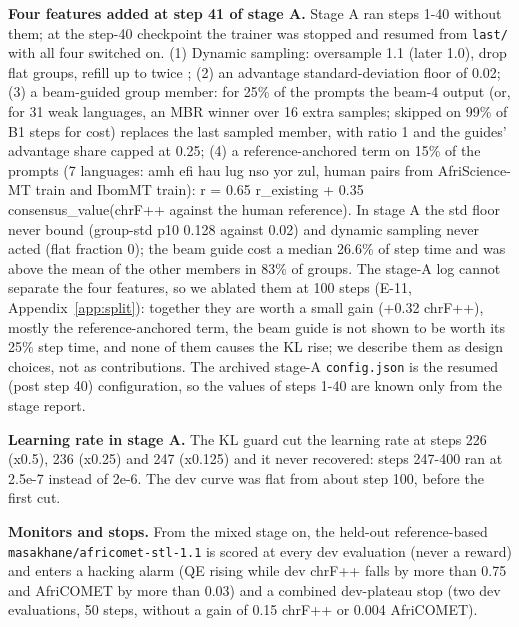 \textbf{Four features added at step 41 of stage A.} Stage A ran steps 1-40 without them; at the step-40 checkpoint the trainer was stopped and resumed from \texttt{last/\allowbreak{}} with all four switched on. (1) Dynamic sampling: oversample 1.1 (later 1.0), drop flat groups, refill up to twice \citep{yu2025dapo}; (2) an advantage standard-deviation floor of 0.02; (3) a beam-guided group member: for 25\% of the prompts the beam-4 output (or, for 31 weak languages, an MBR winner over 16 extra samples; skipped on 99\% of B1 steps for cost) replaces the last sampled member, with ratio 1 and the guides' advantage share capped at 0.25; (4) a reference-anchored term on 15\% of the prompts (7 languages: amh efi hau lug nso yor zul, human pairs from AfriScience-MT train and IbomMT train): r = 0.65 r\_existing + 0.35 consensus\_value(chrF++ against the human reference). In stage A the std floor never bound (group-std p10 0.128 against 0.02) and dynamic sampling never acted (flat fraction 0); the beam guide cost a median 26.6\% of step time and was above the mean of the other members in 83\% of groups. The stage-A log cannot separate the four features, so we ablated them at 100 steps (E-11, Appendix~\ref{app:split}): together they are worth a small gain (+0.32 chrF++), mostly the reference-anchored term, the beam guide is not shown to be worth its 25\% step time, and none of them causes the KL rise; we describe them as design choices, not as contributions. The archived stage-A \texttt{config.\allowbreak{}json} is the resumed (post step 40) configuration, so the values of steps 1-40 are known only from the stage report. 

\textbf{Learning rate in stage A.} The KL guard cut the learning rate at steps 226 (x0.5), 236 (x0.25) and 247 (x0.125) and it never recovered: steps 247-400 ran at 2.5e-7 instead of 2e-6. The dev curve was flat from about step 100, before the first cut. 

\textbf{Monitors and stops.} From the mixed stage on, the held-out reference-based \texttt{masakhane/\allowbreak{}africomet-\allowbreak{}stl-\allowbreak{}1.\allowbreak{}1} is scored at every dev evaluation (never a reward) and enters a hacking alarm (QE rising while dev chrF++ falls by more than 0.75 and AfriCOMET by more than 0.03) and a combined dev-plateau stop (two dev evaluations, 50 steps, without a gain of 0.15 chrF++ or 0.004 AfriCOMET). 

